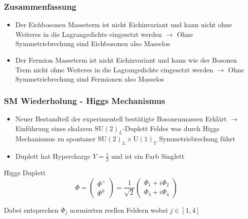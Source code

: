 \documentclass{beamer}
\begin{document}
\begin{frame}
\frametitle{Zusammenfassung}
\begin{itemize}
\item Der Eichbosonen Masseterm ist nicht Eichinvariant und kann nicht ohne Weiteres in die Lagrangedichte  eingesetzt werden $\rightarrow$ Ohne Symmetriebrechung sind Eichbosonen also Masselos
\item Der Fermion Masseterm ist nicht Eichinvariant und kann wie der Bosonen Trem  nicht ohne Weiteres in die Lagrangedichte  eingesetzt werden $\rightarrow$ Ohne Symmetriebrechung sind Fermionen also Masselos
\end{itemize}
\end{frame}
\begin{frame}
\frametitle{SM Wiederholung - Higgs Mechanismus }
\begin{itemize}
\item Neuer Bestandteil der experimentell bestätigte Bosonenmassen Erklärt $\rightarrow$ Einführung eines skalaren $\text{SU}(2)_{L}$-Duplett Feldes was durch Higgs Mechanismus zu spontaner $\text{SU}(2)_{L}\times\text{U}(1)_{Y}$ Symmetriebrechung führt
\item Duplett hat Hypercharge $Y=\frac{1}{2}$ und ist ein Farb Singlett 
\end{itemize}

\begin{block}{Higgs Duplett}
\begin{equation}
\Phi=\left( \begin{array}{c} \Phi^{+}\\ \Phi^{0} \end{array}\right)= \frac{1}{\sqrt{2}}\left( \begin{array}{c} \Phi_{1}+i\Phi_{2}\\ \Phi_{3}+i\Phi_{4} \end{array}\right)
\end{equation}
\end{block}
Dabei entsprechen $\Phi_{j}$  normierten reellen Feldern wobei $j \in [1,4] $
\end{frame}
\end{document}
